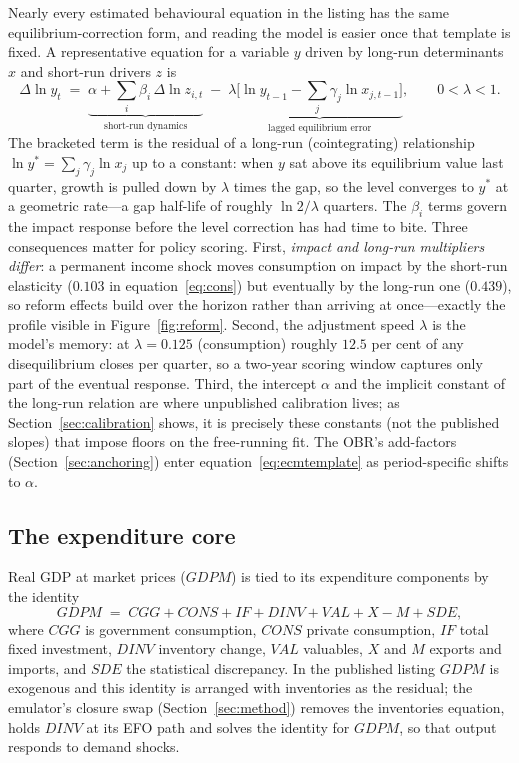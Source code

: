 Nearly every estimated behavioural equation in the listing has the same equilibrium-correction form, and reading the model is easier once that template is fixed. A representative equation for a variable $y$ driven by long-run determinants $x$ and short-run drivers $z$ is
\begin{equation}
\Delta \ln y_t \;=\; \underbrace{\alpha + \textstyle\sum_i \beta_i\, \Delta \ln z_{i,t}}_{\text{short-run dynamics}} \;-\; \lambda \underbrace{\big[\ln y_{t-1} - \textstyle\sum_j \gamma_j \ln x_{j,t-1}\big]}_{\text{lagged equilibrium error}},
\qquad 0 < \lambda < 1 .
\label{eq:ecmtemplate}
\end{equation}
The bracketed term is the residual of a long-run (cointegrating) relationship $\ln y^* = \sum_j \gamma_j \ln x_j$ up to a constant: when $y$ sat above its equilibrium value last quarter, growth is pulled down by $\lambda$ times the gap, so the level converges to $y^*$ at a geometric rate---a gap half-life of roughly $\ln 2/\lambda$ quarters. The $\beta_i$ terms govern the impact response before the level correction has had time to bite. Three consequences matter for policy scoring. First, \emph{impact and long-run multipliers differ}: a permanent income shock moves consumption on impact by the short-run elasticity ($0.103$ in equation~\eqref{eq:cons}) but eventually by the long-run one ($0.439$), so reform effects build over the horizon rather than arriving at once---exactly the profile visible in Figure~\ref{fig:reform}. Second, the adjustment speed $\lambda$ is the model's memory: at $\lambda = 0.125$ (consumption) roughly $12.5$ per cent of any disequilibrium closes per quarter, so a two-year scoring window captures only part of the eventual response. Third, the intercept $\alpha$ and the implicit constant of the long-run relation are where unpublished calibration lives; as Section~\ref{sec:calibration} shows, it is precisely these constants (not the published slopes) that impose floors on the free-running fit. The OBR's add-factors (Section~\ref{sec:anchoring}) enter equation~\eqref{eq:ecmtemplate} as period-specific shifts to $\alpha$.

\subsection{The expenditure core}

Real GDP at market prices ($GDPM$) is tied to its expenditure components by the identity
\begin{equation}
GDPM \;=\; CGG + CONS + IF + DINV + VAL + X - M + SDE,
\label{eq:gdpid}
\end{equation}
where $CGG$ is government consumption, $CONS$ private consumption, $IF$ total fixed investment, $DINV$ inventory change, $VAL$ valuables, $X$ and $M$ exports and imports, and $SDE$ the statistical discrepancy. In the published listing $GDPM$ is exogenous and this identity is arranged with inventories as the residual; the emulator's closure swap (Section~\ref{sec:method}) removes the inventories equation, holds $DINV$ at its EFO path and solves the identity for $GDPM$, so that output responds to demand shocks.

